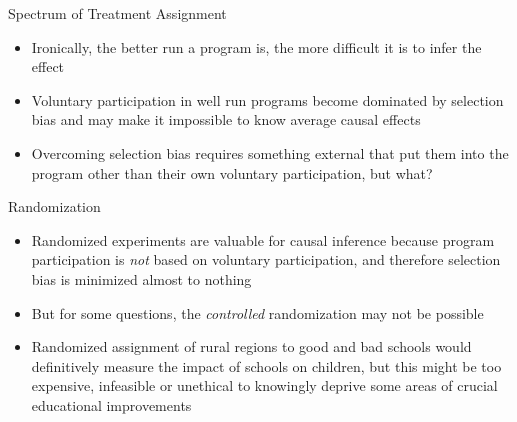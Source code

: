 \documentclass{beamer}
\begin{document}
\begin{frame}{Spectrum of Treatment Assignment}

\begin{itemize}

\item Ironically, the better run a program is, the more difficult it is to infer the effect 
\item Voluntary participation in well run programs become dominated by selection bias and may make it impossible to know average causal effects
\item Overcoming selection bias requires something external that put them into the program other than their own voluntary participation, but what?

\end{itemize}

\end{frame}




\begin{frame}{Randomization}
\begin{center}
\end{center}

\bigskip

\begin{itemize}
\item Randomized experiments are valuable for causal inference because program participation is \emph{not} based on voluntary participation, and therefore selection bias is minimized almost to nothing
\item But for some questions, the \emph{controlled} randomization may not be possible 
\item Randomized assignment of rural regions to good and bad schools would definitively measure the impact of schools on children, but this might be too expensive, infeasible or unethical to knowingly deprive some areas of crucial educational improvements
\end{itemize}



\end{frame}
\end{document}
